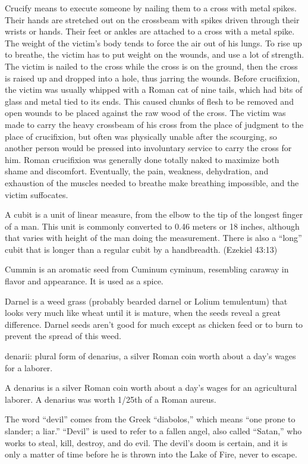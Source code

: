 \begin{multicols}{2}
Crucify means to execute someone by nailing them to a cross with
metal spikes. Their hands are stretched out on the crossbeam with
spikes driven through their wrists or hands. Their feet or ankles are
attached to a cross with a metal spike. The weight of the victim's
body tends to force the air out of his lungs. To rise up to breathe,
the victim has to put weight on the wounds, and use a lot of
strength. The victim is nailed to the cross while the cross is on the
ground, then the cross is raised up and dropped into a hole, thus
jarring the wounds. Before crucifixion, the victim was usually
whipped with a Roman cat of nine tails, which had bits of glass and
metal tied to its ends. This caused chunks of flesh to be removed and
open wounds to be placed against the raw wood of the cross. The
victim was made to carry the heavy crossbeam of his cross from the
place of judgment to the place of crucifixion, but often was
physically unable after the scourging, so another person would be
pressed into involuntary service to carry the cross for him. Roman
crucifixion was generally done totally naked to maximize both shame
and discomfort. Eventually, the pain, weakness, dehydration, and
exhaustion of the muscles needed to breathe make breathing
impossible, and the victim suffocates.

A cubit is a unit of linear measure, from the elbow to the tip of the
longest finger of a man. This unit is commonly converted to 0.46
meters or 18 inches, although that varies with height of the man
doing the measurement. There is also a {``}long{''} cubit that is
longer than a regular cubit by a handbreadth. (Ezekiel 43:13)

Cummin is an aromatic seed from Cuminum cyminum, resembling caraway
in flavor and appearance. It is used as a spice.

Darnel is a weed grass (probably bearded darnel or Lolium temulentum)
that looks very much like wheat until it is mature, when the seeds
reveal a great difference. Darnel seeds aren't good for much except
as chicken feed or to burn to prevent the spread of this weed.

denarii: plural form of denarius, a silver Roman coin worth about a
day's wages for a laborer.

A denarius is a silver Roman coin worth about a day's wages for an
agricultural laborer. A denarius was worth 1/25th of a Roman aureus.

The word {``}devil{''} comes from the Greek {``}diabolos,{''} which
means {``}one prone to slander; a liar.{''} {``}Devil{''} is used to
refer to a fallen angel, also called {``}Satan,{''} who works to
steal, kill, destroy, and do evil.  The devil's doom is certain, and
it is only a matter of time before he is thrown into the Lake of
Fire, never to escape.


\end{multicols}
